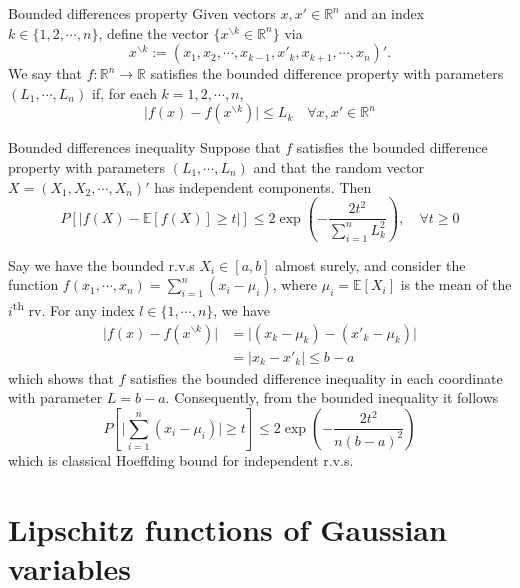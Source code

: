 \documentclass[10pt,handout,english]{beamer}
\newcommand{\ts}{\textsuperscript}
\newcommand{\E}{\mathbb{E}}
\newcommand{\R}{\mathbb{R}}
\newcommand{\1}{\mathbbm{1}}
\begin{document}
\begin{frame}
\begin{block}{Bounded differences property}
Given vectors $x,x'\in\R^n$ and an index $k\in\{1,2,\cdots,n\}$, define the vector $\{x^{\backslash k}\in\R^n\}$ via
\[
x^{\backslash k}:=(x_1,x_2,\cdots,x_{k-1},x'_k,x_{k+1},\cdots,x_n)'.
\]
We say that $f:\R^n\to\R$ satisfies the bounded difference property with parameters $(L_1,\cdots,L_n)$ if, for each $k=1,2,\cdots,n$,
\[
\lvert f(x)-f(x^{\backslash k})\rvert\leq L_k\quad \forall x,x'\in\R^n
\]
\end{block}
\end{frame}
\begin{frame}
\begin{block}{Bounded differences inequality}
Suppose that $f$ satisfies the bounded difference property with parameters $(L_1,\cdots,L_n)$ and that the random vector $X=(X_1,X_2,\cdots,X_n)'$ has independent components. Then
\[
P[\lvert f(X)-\E[f(X)]\geq t\rvert]\leq 2\exp\left(-\frac{2t^2}{\sum_{i=1}^{n}L_k^2}\right),\quad \forall t\geq 0
\]
\end{block}
\end{frame}
\begin{frame}
\begin{example}
Say we have the bounded r.v.s $X_i\in[a,b]$ almost surely, and consider the function $f(x_1,\cdots,x_n)=\sum_{i=1}^n(x_i-\mu_i)$, where $\mu_i=\E[X_i]$ is the mean of the $i$\ts{th} rv. For any index $l\in\{1,\cdots,n\}$, we have
\begin{align*}
\lvert f(x)-f(x^{\backslash k})\rvert&=\lvert (x_k-\mu_k)-(x'_k-\mu_k)\rvert\\
&=\lvert x_k-x'_k\rvert\leq b-a 
\end{align*}
which shows that $f$ satisfies the bounded difference inequality in each coordinate with parameter $L=b-a$. Consequently, from the bounded inequality it follows
\[
P\left[\lvert\sum\limits_{i=1}^{n}(x_i-\mu_i)\rvert\geq t\right]\leq 2\exp\left(-\frac{2t^2}{n(b-a)^2}\right)
\]
which is classical Hoeffding bound for independent r.v.s.
\end{example}
\end{frame}
\section{Lipschitz functions of Gaussian variables}
\frame{\tableofcontents[currentsection]}
\end{document}
